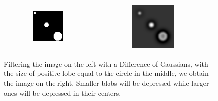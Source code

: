 \documentclass{llncs}
\begin{document}
\begin{figure}[]
  \begin{center}
    \begin{tabular}{cc}
       \includegraphics[width=0.37\textwidth]{figs/attention/dog1} &
       \includegraphics[width=0.37\textwidth]{figs/attention/dog2}
    \end{tabular}
    \caption{\label{fig:multiscale}Filtering the image on the left
     with a Difference-of-Gaussians, with the size of positive lobe
     equal to the circle in the middle, we obtain the
     image on the right. Smaller blobs will be depressed while larger
     ones will be depressed in their centers.}
  \end{center}
\end{figure}

\end{document}
